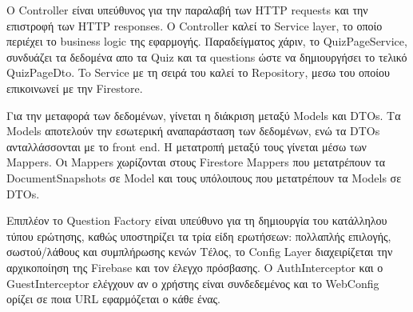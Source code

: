 \documentclass{article}
\begin{document}
O \foreignlanguage{english}{Controller} είναι υπεύθυνος για την παραλαβή των \foreignlanguage{english}{HTTP requests} και την επιστροφή των \foreignlanguage{english}{HTTP responses}. Ο \foreignlanguage{english}{Controller} καλεί το \foreignlanguage{english}{Service layer}, το οποίο περιέχει το \foreignlanguage{english}{business logic} της εφαρμογής. Παραδείγματος χάριν, το \foreignlanguage{english}{QuizPageService}, συνδυάζει τα δεδομένα απο τα \foreignlanguage{english}{Quiz} και τα \foreignlanguage{english}{questions} ώστε να δημιουργήσει το τελικό \foreignlanguage{english}{QuizPageDto}. To \foreignlanguage{english}{Service} με τη σειρά του καλεί το \foreignlanguage{english}{Repository}, μεσω του οποίου επικοινωνεί με την \foreignlanguage{english}{Firestore}.

Για την μεταφορά των δεδομένων, γίνεται η διάκριση μεταξύ \foreignlanguage{english}{Models} και \foreignlanguage{english}{DTOs}. Τα \foreignlanguage{english}{Models} αποτελούν την εσωτερική αναπαράσταση των δεδομένων, ενώ τα \foreignlanguage{english}{DTOs} ανταλλάσσονται με το \foreignlanguage{english}{front end}. Η μετατροπή μεταξύ τους γίνεται μέσω των \foreignlanguage{english}{Mappers}. Οι \foreignlanguage{english}{Mappers} χωρίζονται στους \foreignlanguage{english}{Firestore Mappers} που μετατρέπουν τα \foreignlanguage{english}{DocumentSnapshots} σε \foreignlanguage{english}{Model} και τους υπόλοιπους που μετατρέπουν τα \foreignlanguage{english}{Models} σε \foreignlanguage{english}{DTOs}.

Επιπλέον το \foreignlanguage{english}{Question Factory} είναι υπεύθυνο για τη δημιουργία του κατάλληλου τύπου ερώτησης, καθώς υποστηρίζει τα τρία είδη ερωτήσεων: πολλαπλής επιλογής, σωστού/λάθους και συμπλήρωσης κενών
Τέλος, το \foreignlanguage{english}{Config Layer} διαχειρίζεται την αρχικοποίηση της \foreignlanguage{english}{Firebase} και τον έλεγχο πρόσβασης. Ο \foreignlanguage{english}{AuthInterceptor} και ο \foreignlanguage{english}{GuestInterceptor} ελέγχουν αν ο χρήστης είναι συνδεδεμένος και το \foreignlanguage{english}{WebConfig} ορίζει σε ποια \foreignlanguage{english}{URL} εφαρμόζεται ο κάθε ένας.
\end{document}
